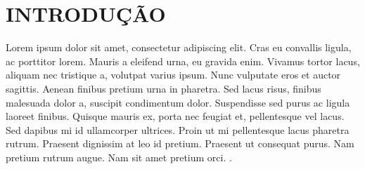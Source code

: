 \documentclass[12pt,a4paper]{article}
\begin{document}
\clearpage
{}
\listoffigures
\thispagestyle{empty}
\clearpage


\listofquadros
\thispagestyle{empty}
\clearpage


\listoftables
\thispagestyle{empty}
\clearpage



 \clearpage
{} %
\tableofcontents %
\thispagestyle{empty} %
\clearpage



\clearpage %
\section{INTRODUÇÃO}


Lorem ipsum dolor sit amet, consectetur adipiscing elit. Cras eu convallis ligula, ac porttitor lorem. Mauris a eleifend urna, eu gravida enim. Vivamus tortor lacus, aliquam nec tristique a, volutpat varius ipsum. Nunc vulputate eros et auctor sagittis. Aenean finibus pretium urna in pharetra. Sed lacus risus, finibus malesuada dolor a, suscipit condimentum dolor. Suspendisse sed purus ac ligula laoreet finibus. Quisque mauris ex, porta nec feugiat et, pellentesque vel lacus. Sed dapibus mi id ullamcorper ultrices. Proin ut mi pellentesque lacus pharetra rutrum. Praesent dignissim at leo id pretium. Praesent ut consequat purus. Nam pretium rutrum augue. Nam sit amet pretium orci. \cite{abnt2024}. 
\end{document}
